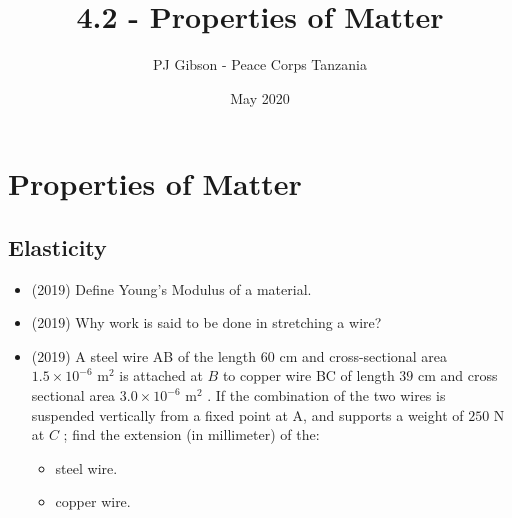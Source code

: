 \documentclass{article}
\title{4.2 - Properties of Matter}
\author{PJ Gibson - Peace Corps Tanzania}
\date{May 2020}
\begin{document}
\maketitle


\section{Properties of Matter}

\subsection{Elasticity}
\begin{itemize}
\item (2019)  Define Young’s Modulus of a material. 
\item (2019)  Why work is said to be done in stretching a wire? 
\item (2019)  A steel wire AB of the length $ 60$ cm and cross-sectional area $ 1.5 \times 10^{-6}$ m$ ^{2}$ is attached at $ B$ to copper wire BC of length $ 39$ cm and cross sectional area $ 3.0 \times 10^{-6}$ m$ ^{2}$ . If the combination of the two wires is suspended vertically from a fixed point at A, and supports a weight of $ 250$ N at $ C$ ; find the extension (in millimeter) of the:
 \begin{itemize}
\item steel wire. 
\item copper wire. 
\end{itemize}
\end{itemize}
\end{document}
